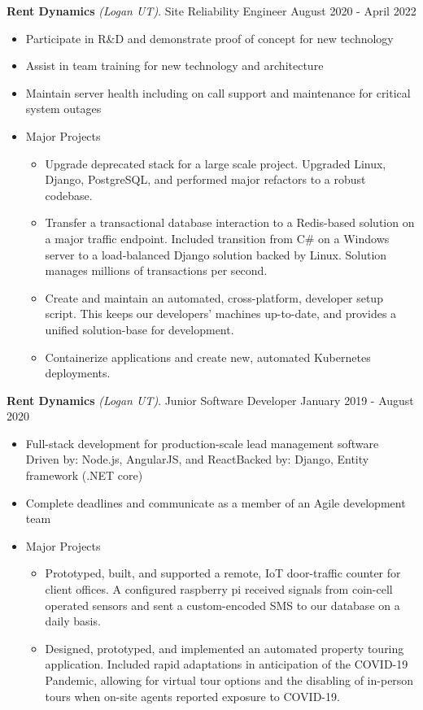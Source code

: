 \documentclass[letterpaper,11pt]{article}
\begin{document}
\textbf{Rent Dynamics} \textit{(Logan UT)}. Site Reliability Engineer \hfill August 2020 - April 2022
\begin{itemize}[noitemsep,topsep=0pt]
	\item Participate in R\&D and demonstrate proof of concept for new technology
	\item Assist in team training for new technology and architecture
	\item Maintain server health including on call support and maintenance for critical system outages
	\item Major Projects \begin{itemize}[noitemsep, topsep=0pt]
		\item Upgrade deprecated stack for a large scale project. Upgraded Linux, Django, PostgreSQL, and performed major refactors to a robust codebase.
		\item Transfer a transactional database interaction to a Redis-based solution on a major traffic endpoint. Included transition from C\# on a Windows server to a load-balanced Django solution backed by Linux. Solution manages millions of transactions per second.
		\item Create and maintain an automated, cross-platform, developer setup script. This keeps our developers' machines up-to-date, and provides a unified solution-base for development.
		\item Containerize applications and create new, automated Kubernetes deployments.\\
	\end{itemize}
\end{itemize}

\textbf{Rent Dynamics} \textit{(Logan UT)}. Junior Software Developer \hfill January 2019 - August 2020
\begin{itemize}[noitemsep,topsep=0pt]
	\item Full-stack development for production-scale lead management software\\ Driven by: Node.js, AngularJS, and React\qquad\quad Backed by: Django, Entity framework (.NET core)
	\item Complete deadlines and communicate as a member of an Agile development team
	\item Major Projects \begin{itemize}[noitemsep, topsep=0pt]
		\item Prototyped, built, and supported a remote, IoT door-traffic counter for client offices. A configured raspberry pi received signals from coin-cell operated sensors and sent a custom-encoded SMS to our database on a daily basis.
		\item Designed, prototyped, and implemented an automated property touring application. Included rapid adaptations in anticipation of the COVID-19 Pandemic, allowing for virtual tour options and the disabling of in-person tours when on-site agents reported exposure to COVID-19.\\
	\end{itemize}
\end{itemize}
\end{document}

